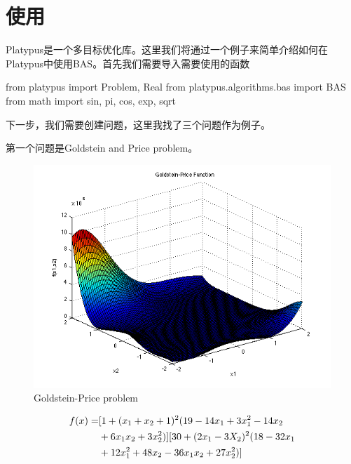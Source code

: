 \documentclass[]{ctexbook}
\newenvironment{Shaded}{\begin{snugshade}}{\end{snugshade}}
\newcommand{\ImportTok}[1]{#1}
\newcommand{\NormalTok}[1]{#1}
\begin{document}
\section{使用}

Platypus是一个多目标优化库。这里我们将通过一个例子来简单介绍如何在Platypus中使用BAS。首先我们需要导入需要使用的函数

\begin{Shaded}
\begin{Highlighting}[]
\ImportTok{from}\NormalTok{ platypus }\ImportTok{import}\NormalTok{ Problem, Real}
\ImportTok{from}\NormalTok{ platypus.algorithms.bas }\ImportTok{import}\NormalTok{ BAS}
\ImportTok{from}\NormalTok{ math }\ImportTok{import}\NormalTok{ sin, pi, cos, exp, sqrt}
\end{Highlighting}
\end{Shaded}

下一步，我们需要创建问题，这里我找了三个问题作为例子。

第一个问题是Goldstein and Price problem。

\begin{figure}

{\centering \includegraphics[width=0.7\linewidth]{img/python1} 

}

\caption{Goldstein-Price problem}\label{fig:python1}
\end{figure}

\begin{equation}
\begin{split}
f({x})=& [1+(x_1+x_2+1)^2(19-14x_1+3x_1^2-14x_2\notag \\
& +6x_1x_2+3x_2^2)][30+(2x_1-3X_2)^2(18-32x_1\notag  \\
& +12x_1^2+48x_2-36x_1x_2+27x_2^2)]\notag
\end{split}
\end{equation}
\end{document}
